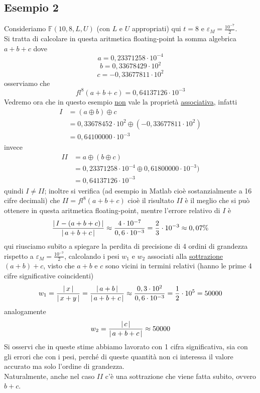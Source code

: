 \subsection{Esempio 2}
Consideriamo $\mathbb{F}(10,8,L,U)$ (con $L$ e $U$ appropriati) qui $t=8$ e $\varepsilon_M = \frac{10^{-7}}{2}$. \\
Si tratta di calcolare in questa aritmetica floating-point la somma algebrica $a+b+c$ dove \[a=0,23371258 \cdot 10^{-4}\] \[b=0,33678429 \cdot 10^2\] \[c=-0,33677811 \cdot 10^2\] osserviamo che 
\[fl^8(a+b+c)=0,64137126 \cdot 10^{-3}\]
Vedremo ora che in questo esempio \uline{non} vale la proprietà \uline{associativa}, infatti
\[\begin{split}
    I & = (a \oplus b) \oplus c \\
    & = 0,33678452 \cdot 10^2 \oplus (-0,33677811 \cdot 10^2)\\
    & = 0,64100000 \cdot 10^{-3}
\end{split}\]
invece
\[\begin{split}
    II & = a \oplus (b \oplus c) \\
    & = 0,23371258 \cdot 10^{-4} \oplus 0,61800000 \cdot 10^{-3})\\
    & = 0,64137126 \cdot 10^{-3}
\end{split}\]
quindi $I \ne II$; inoltre si verifica (ad esempio in Matlab cioè sostanzialmente a 16 cifre decimali) che $II = fl^8(a+b+c)$ cioè il risultato $II$ è il meglio che si può ottenere in questa aritmetica floating-point, mentre l'errore relativo di $I$ è 
\[\frac{\lvert\,I-(a+b+c)\,\rvert}{\lvert\,a+b+c\,\rvert} \approx \frac{4 \cdot 10^{-7}}{0,6 \cdot 10^{-3}} = \frac{2}{3} \cdot 10^{-3} \approx 0,07\%\] 
qui riusciamo subito a spiegare la perdita di precisione di 4 ordini di grandezza rispetto a $\varepsilon_M = \frac{10^{-7}}{2}$, calcolando i pesi $w_1$ e $w_2$ associati alla \uline{sottrazione} $(a+b)+c$, visto che $a+b$ e $c$ sono vicini in termini relativi (hanno le prime 4 cifre significative coincidenti)
\[w_1 = \frac{\lvert\,x\,\rvert}{\lvert\,x+y\,\rvert} = \frac{\lvert\,a+b\,\rvert}{\lvert\,a+b+c\,\rvert} \approx\frac{0,3 \cdot 10^2}{0,6 \cdot10^{-3}} = \frac{1}{2} \cdot 10^5 = 50000\]
analogamente
\[w_2 = \frac{\lvert\,c\,\rvert}{\lvert\,a+b+c\,\rvert}\approx 50000\]
Si osservi che in queste stime abbiamo lavorato con 1 cifra significativa, sia con gli errori che con i pesi, perché di queste quantità non ci interessa il valore accurato ma solo l'ordine di grandezza.\\
Naturalmente, anche nel caso $II$ c'è una sottrazione che viene fatta subito, ovvero $b+c$.\\
